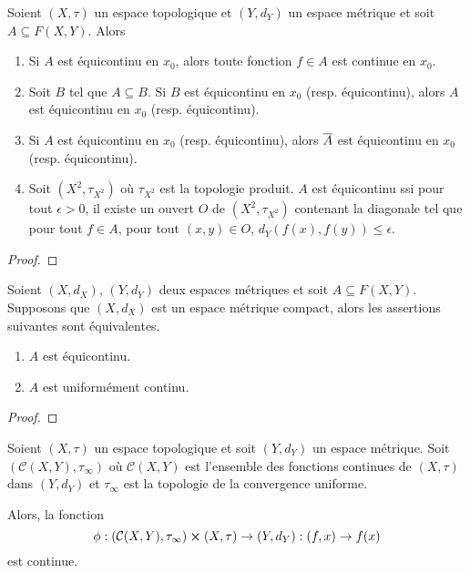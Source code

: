 \begin{proposition}
	Soient $(X, \tau)$ un espace topologique et $(Y, d_{Y})$ un espace métrique
	et soit $A \subseteq F(X, Y)$. Alors

	\begin{enumerate}
		\item Si $A$ est équicontinu en $x_{0}$, alors toute fonction $f \in A$
			est continue en $x_{0}$.
		\item Soit $B$ tel que $A \subseteq B$. Si $B$ est équicontinu en
			$x_{0}$ (resp. équicontinu), alors $A$ est équicontinu en $x_{0}$
			(resp. équicontinu).
		\item Si $A$ est équicontinu en $x_{0}$ (resp. équicontinu), alors
			$\overline{A}$ est équicontinu en $x_{0}$ (resp. équicontinu).
		\item Soit $(X^{2}, \tau_{X^{2}})$ où $\tau_{X^{2}}$ est la topologie
			produit. $A$ est équicontinu ssi pour tout $\epsilon > 0$, il existe un
			ouvert $O$ de $(X^{2}, \tau_{X^{2}})$ contenant la diagonale tel que
			pour tout $f \in A$, pour tout $(x, y) \in O$, $d_{Y}(f(x), f(y))
			\leq \epsilon$.
	\end{enumerate}
\end{proposition}

\ifdefined\outputproof
\begin{proof}

\end{proof}
\fi

\begin{proposition}
	Soient $(X, d_{X})$, $(Y, d_{Y})$ deux espaces métriques
	et soit $A \subseteq F(X, Y)$. Supposons que $(X, d_{X})$ est un espace
	métrique compact, alors les assertions suivantes sont équivalentes.

	\begin{enumerate}
		\item $A$ est équicontinu.
		\item $A$ est uniformément continu.
	\end{enumerate}
\end{proposition}

\ifdefined\outputproof
\begin{proof}

\end{proof}
\fi

\begin{proposition}
	Soient $(X, \tau)$ un espace topologique et soit $(Y, d_{Y})$ un espace métrique.
	Soit $(\mathcal{C}(X, Y), \tau_{\infty})$ où $\mathcal{C}(X, Y)$ est
	l'ensemble des fonctions continues de $(X, \tau)$ dans $(Y, d_{Y})$ et
	$\tau_{\infty}$ est la topologie de la convergence uniforme.

	Alors, la fonction
	\begin{equation}
		\phi : (\mathcal{C}(X, Y), \tau_{\infty}) \cross (X, \tau)
		\rightarrow (Y, d_{Y}) : (f, x) \rightarrow f(x)
	\end{equation}
	est continue.
\end{proposition}

